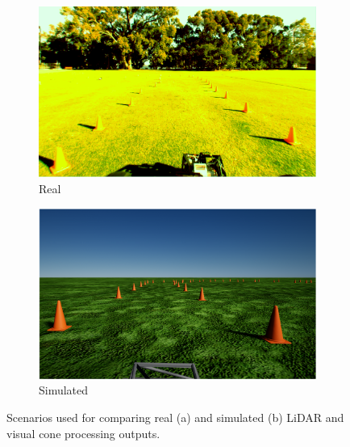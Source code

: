 \begin{figure}[H]
	\centering
	\begin{subfigure}[b]{0.45\textwidth}
		\includegraphics[width=\textwidth]{scenarioReal}
		\caption{Real}
		\label{fig:8:lidarScenarios:real}   
	\end{subfigure} 
	\hspace{1em}         
	\begin{subfigure}[b]{0.45\textwidth}
		\includegraphics[width=\textwidth]{scenarioSim}
		\caption{Simulated}
		\label{fig:8:lidarScenarios:sim}
	\end{subfigure}             
	\caption[Scenarios used for comparing real and simulated cone processing outputs]{Scenarios used for comparing real (a) and simulated (b) LiDAR and visual cone processing outputs.}
	\label{fig:8:lidarScenarios}
\end{figure}

